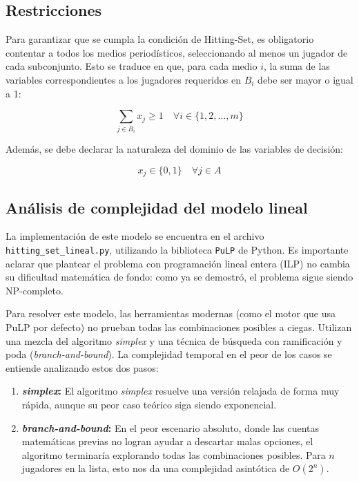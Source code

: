 \subsection*{Restricciones}
Para garantizar que se cumpla la condición de Hitting-Set, es obligatorio contentar a todos los medios periodísticos, seleccionando al menos un jugador de cada subconjunto. Esto se traduce en que, para cada medio $i$, la suma de las variables correspondientes a los jugadores requeridos en $B_i$ debe ser mayor o igual a 1:

\begin{equation}
    \sum_{j \in B_i} x_j \geq 1 \quad \forall i \in \{1, 2, \dots, m\}
\end{equation}

Además, se debe declarar la naturaleza del dominio de las variables de decisión:

\begin{equation}
    x_j \in \{0, 1\} \quad \forall j \in A
\end{equation}

\subsection*{Análisis de complejidad del modelo lineal}

La implementación de este modelo se encuentra en el archivo \texttt{hitting\_set\_lineal.py}, utilizando la biblioteca \texttt{PuLP} de Python. Es importante aclarar que plantear el problema con programación lineal entera (ILP) no cambia su dificultad matemática de fondo: como ya se demostró, el problema sigue siendo NP-completo.

Para resolver este modelo, las herramientas modernas (como el motor que usa PuLP por defecto) no prueban todas las combinaciones posibles a ciegas. Utilizan una mezcla del algoritmo \textit{simplex} y una técnica de búsqueda con ramificación y poda (\textit{branch-and-bound}). La complejidad temporal en el peor de los casos se entiende analizando estos dos pasos:

\begin{enumerate}
    \item \textbf{\textit{simplex}:} El algoritmo \textit{simplex} resuelve una versión relajada de forma muy rápida, aunque su peor caso teórico siga siendo exponencial.
    
    \item \textbf{\textit{branch-and-bound}:} En el peor escenario absoluto, donde las cuentas matemáticas previas no logran ayudar a descartar malas opciones, el algoritmo terminaría explorando todas las combinaciones posibles. Para $n$ jugadores en la lista, esto nos da una complejidad asintótica de $O(2^n)$.
\end{enumerate}

